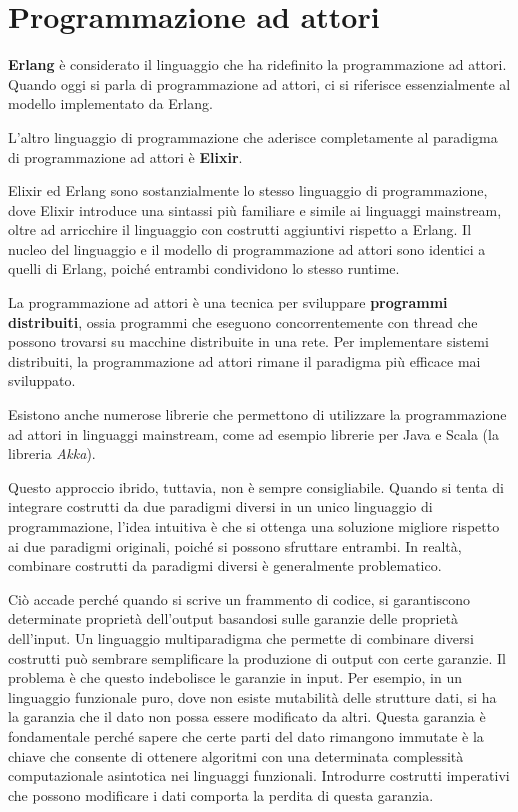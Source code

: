 \documentclass{article}
\begin{document}
\pagestyle{empty}

\section*{Programmazione ad attori}
\large

\textbf{Erlang} è considerato il linguaggio che ha ridefinito la programmazione ad attori. Quando oggi si parla di programmazione ad attori, ci si riferisce essenzialmente al modello implementato da Erlang.

L'altro linguaggio di programmazione che aderisce completamente al paradigma di programmazione ad attori è \textbf{Elixir}.

Elixir ed Erlang sono sostanzialmente lo stesso linguaggio di programmazione, dove Elixir introduce una sintassi più familiare e simile ai linguaggi mainstream, oltre ad arricchire il linguaggio con costrutti aggiuntivi rispetto a Erlang. Il nucleo del linguaggio e il modello di programmazione ad attori sono identici a quelli di Erlang, poiché entrambi condividono lo stesso runtime.

La programmazione ad attori è una tecnica per sviluppare \textbf{programmi distribuiti}, ossia programmi che eseguono concorrentemente con thread che possono trovarsi su macchine distribuite in una rete. Per implementare sistemi distribuiti, la programmazione ad attori rimane il paradigma più efficace mai sviluppato.

Esistono anche numerose librerie che permettono di utilizzare la programmazione ad attori in linguaggi mainstream, come ad esempio librerie per Java e Scala (la libreria \textit{Akka}).

Questo approccio ibrido, tuttavia, non è sempre consigliabile. Quando si tenta di integrare costrutti da due paradigmi diversi in un unico linguaggio di programmazione, l'idea intuitiva è che si ottenga una soluzione migliore rispetto ai due paradigmi originali, poiché si possono sfruttare entrambi. In realtà, combinare costrutti da paradigmi diversi è generalmente problematico.

Ciò accade perché quando si scrive un frammento di codice, si garantiscono determinate proprietà dell'output basandosi sulle garanzie delle proprietà dell'input. Un linguaggio multiparadigma che permette di combinare diversi costrutti può sembrare semplificare la produzione di output con certe garanzie. Il problema è che questo indebolisce le garanzie in input.
Per esempio, in un linguaggio funzionale puro, dove non esiste mutabilità delle strutture dati, si ha la garanzia che il dato non possa essere modificato da altri. Questa garanzia è fondamentale perché sapere che certe parti del dato rimangono immutate è la chiave che consente di ottenere algoritmi con una determinata complessità computazionale asintotica nei linguaggi funzionali. Introdurre costrutti imperativi che possono modificare i dati comporta la perdita di questa garanzia.
\end{document}
